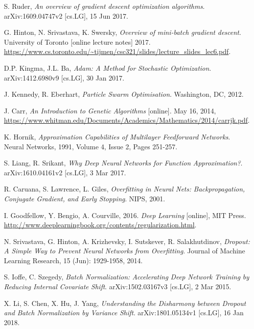 \documentclass[a4paper]{article}
\begin{document}
\begin{thebibliography}{999}

  S. Ruder,
  \emph{An overview of gradient descent optimization algorithms}.
  arXiv:1609.04747v2 [cs.LG],
  15 Jun 2017.

  G. Hinton, N. Srivastava, K. Swersky,
  \emph{Overview of mini-batch gradient descent}.
  University of Toronto
  [online lecture notes]
  2017.
  \url{https://www.cs.toronto.edu/~tijmen/csc321/slides/lecture_slides_lec6.pdf}.

  D.P. Kingma, J.L. Ba,
  \emph{Adam: A Method for Stochastic Optimization}.
  arXiv:1412.6980v9 [cs.LG],
  30 Jan 2017.

  J. Kennedy, R. Eberhart,
  \emph{Particle Swarm Optimisation}.
  Washington, DC,
  2012.

  J. Carr,
  \emph{An Introduction to Genetic Algorithms}
  [online].
  May 16, 2014,
  \url{https://www.whitman.edu/Documents/Academics/Mathematics/2014/carrjk.pdf}.

  K. Hornik,
  \emph{Approximation Capabilities of Multilayer Feedforward Networks}.
  Neural Networks,
  1991,
  Volume 4,
  Issue 2,
  Pages 251-257.

  S. Liang, R. Srikant,
  \emph{Why Deep Neural Networks for Function Approximation?}.
  arXiv:1610.04161v2 [cs.LG],
  3 Mar 2017.

  R. Caruana, S. Lawrence, L. Giles,
  \emph{Overfitting in Neural Nets: Backpropagation, Conjugate Gradient, and Early Stopping}.
  NIPS,
  2001.

  I. Goodfellow, Y. Bengio, A. Courville,
  2016.
  \emph{Deep Learning}
  [online],
  MIT Press.
  \url{http://www.deeplearningbook.org/contents/regularization.html}.

  N. Srivastava, G. Hinton, A. Krizhevsky, I. Sutskever, R. Salakhutdinov,
  \emph{Dropout: A Simple Way to Prevent Neural Networks from Overfitting}.
  Journal of Machine Learning Research, 
  15 (Jun): 1929-1958, 2014.

  S. Ioffe, C. Szegedy,
  \emph{Batch Normalization: Accelerating Deep Network Training by Reducing Internal Covariate Shift}.
  arXiv:1502.03167v3 [cs.LG],
  2 Mar 2015.

X. Li, S. Chen, X. Hu, J. Yang,
\emph{Understanding the Disharmony between Dropout and Batch Normalization by Variance Shift}.
arXiv:1801.05134v1 [cs.LG],
16 Jan 2018.


\end{thebibliography}
\end{document}

